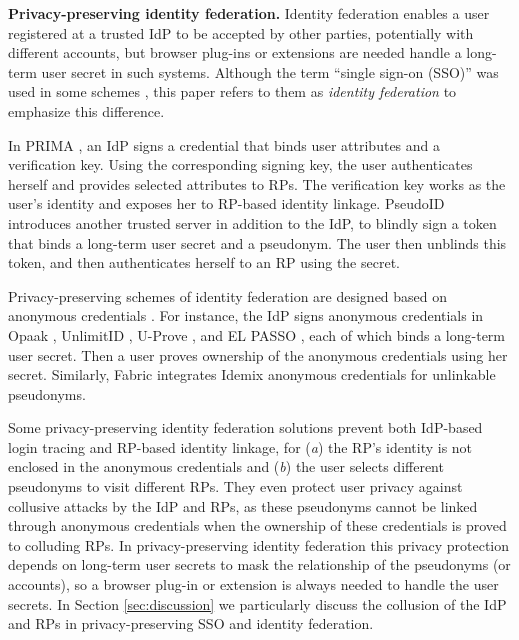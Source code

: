 \noindent\textbf{Privacy-preserving identity federation.}
Identity federation enables a user registered at a trusted IdP to be accepted by other parties, potentially with different accounts,
but %
browser plug-ins or extensions are needed handle a long-term user secret in such systems.
Although the term ``single sign-on (SSO)'' was used in some schemes \cite{PseudoID, Opaak, ELPASSO, WangWS13, HanCSTW18, HanCSTWW20}, this paper refers to them as \emph{identity federation} to emphasize this difference.

In PRIMA \cite{prima}, an IdP signs a credential
that binds user attributes and  a verification key.
Using the corresponding signing key, the user authenticates herself and provides selected attributes to RPs. The verification key works as the user's identity and exposes her to RP-based identity linkage.
PseudoID \cite{PseudoID} introduces another trusted server in addition to the IdP,
 to blindly sign \cite{blind-sign}
a token that binds a long-term user secret and a pseudonym.
The user then unblinds this token,
    and then authenticates herself to an RP using the secret.

Privacy-preserving schemes of identity federation are designed based on anonymous credentials \cite{anon-credential-2001, idemix, anon-credential}.
For instance, the IdP signs anonymous credentials in Opaak \cite{Opaak}, UnlimitID \cite{UnlimitID}, U-Prove \cite{uprov}, and EL PASSO \cite{ELPASSO}, each of which binds a long-term user secret. %
Then a user proves ownership of the anonymous credentials using her secret.
Similarly, Fabric \cite{hyperledge-idemix} integrates Idemix anonymous credentials \cite{idemix} for unlinkable pseudonyms. %


Some privacy-preserving identity federation solutions \cite{PseudoID,ELPASSO,UnlimitID,Opaak,uprov,hyperledge-idemix} prevent both IdP-based login tracing and RP-based identity linkage, for (\emph{a}) the RP's identity is not enclosed in the anonymous credentials and (\emph{b}) the user selects different pseudonyms to visit different RPs.
They even protect user privacy against collusive attacks by the IdP and RPs, as these pseudonyms cannot be linked through anonymous credentials \cite{anon-credential-2001, idemix, anon-credential} when the ownership of these credentials is proved to colluding RPs. %
In privacy-preserving identity federation
this privacy protection depends on long-term user secrets to mask the relationship of the pseudonyms (or accounts),
        so a browser plug-in or extension is always needed to handle the user secrets. 
In Section \ref{sec:discussion}
we particularly discuss the collusion of the IdP and RPs in privacy-preserving SSO and identity federation.

